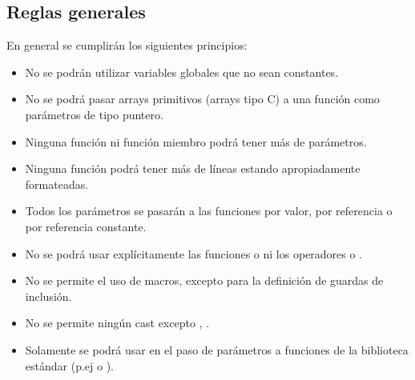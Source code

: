 \subsection{Reglas generales}

En general se cumplirán los siguientes principios:

\begin{itemize}

\item No se podrán utilizar variables globales que no sean constantes.

\item No se podrá pasar arrays primitivos (arrays tipo C)
a una función como parámetros de tipo puntero.

\item Ninguna función ni función miembro podrá tener más de  parámetros.

\item Ninguna función podrá tener más de  líneas estando apropiadamente
formateadas.

\item Todos los parámetros se pasarán a las funciones por valor, por referencia
o por referencia constante.

\item No se podrá usar explícitamente las funciones 
o  ni los operadores  o .

\item No se permite el uso de macros, excepto para la definición de guardas de inclusión.

\item No se permite ningún cast excepto , 
.

\item Solamente se podrá usar  en el paso de parámetros a funciones
de la biblioteca estándar (p.ej  o ).

\end{itemize}
